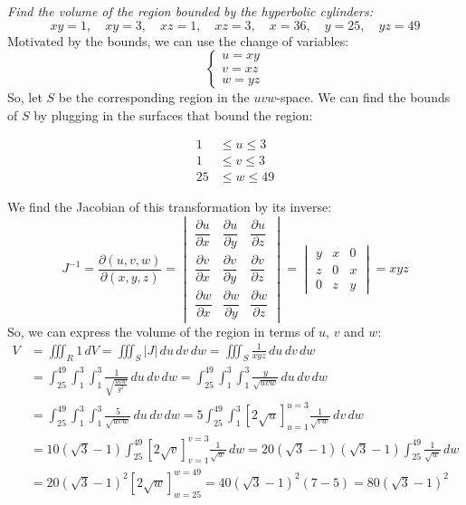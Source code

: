 \documentclass[11pt]{report}
\begin{document}
\begin{example}
    \textit{Find the volume of the region bounded by the hyperbolic cylinders:}
    $$ 
    xy = 1, \quad xy = 3, \quad xz = 1, \quad xz = 3, \quad x = 36, \quad y = 25, \quad yz = 49
    $$
    Motivated by the bounds, we can use the change of variables:
    $$
    \begin{cases}
        u = xy \\
        v = xz \\
        w = yz
    \end{cases} 
    $$
    So, let $S$ be the corresponding region in the $uvw$-space. We can find the bounds of $S$ by plugging in the surfaces that bound the region:

    \begin{align*}
        1 &\leq u \leq 3 \\
        1 &\leq v \leq 3 \\
        25 &\leq w \leq 49
    \end{align*}

    We find the Jacobian of this transformation by its inverse:
    $$
    J^{-1} = \frac{\partial(u,v,w)}{\partial(x,y,z)} = \begin{vmatrix}
        \dfrac{\partial u}{\partial x} & \dfrac{\partial u}{\partial y} & \dfrac{\partial u}{\partial z} \\
        \dfrac{\partial v}{\partial x} & \dfrac{\partial v}{\partial y} & \dfrac{\partial v}{\partial z} \\
        \dfrac{\partial w}{\partial x} & \dfrac{\partial w}{\partial y} & \dfrac{\partial w}{\partial z}
    \end{vmatrix} = \begin{vmatrix}
        y & x & 0 \\
        z & 0 & x \\
        0 & z & y
    \end{vmatrix} = xyz
    $$
    So, we can express the volume of the region in terms of $u$, $v$ and $w$:
    \begin{align*}
        V &= \iiint_R 1 \, dV = \iiint_S |J| \, du \, dv \, dw = \iiint_S \frac{1}{xyz} \, du \, dv \, dw \\
        &= \int_{25}^{49} \int_1^3 \int_1^3 \frac{1}{\sqrt{\frac{uvw}{y^2}}} \, du \, dv \, dw = \int_{25}^{49} \int_1^3 \int_1^3 \frac{y}{\sqrt{uvw}} \, du \, dv \, dw \\
        &= \int_{25}^{49} \int_1^3 \int_1^3 \frac{5}{\sqrt{uvw}} \, du \, dv \, dw = 5 \int_{25}^{49} \int_1^3 \left[ 2\sqrt{u} \right]_{u=1}^{u=3} \frac{1}{\sqrt{vw}} \, dv \, dw \\
        &= 10(\sqrt{3} - 1) \int_{25}^{49} \left[ 2\sqrt{v} \right]_{v=1}^{v=3} \frac{1}{\sqrt{w}} \, dw = 20(\sqrt{3} - 1)(\sqrt{3} - 1) \int_{25}^{49} \frac{1}{\sqrt{w}} \, dw \\
        &= 20(\sqrt{3} - 1)^2 \left[ 2\sqrt{w} \right]_{w=25}^{w=49} = 40(\sqrt{3} - 1)^2 (7 - 5) = 80(\sqrt{3} - 1)^2
    \end{align*}

\end{example}
\end{document}
